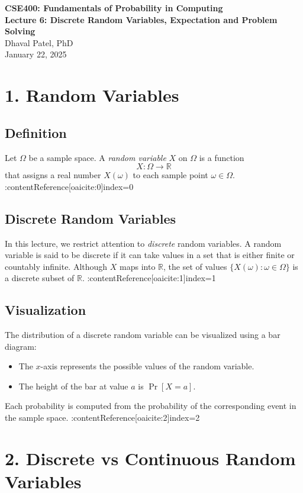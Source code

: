 \documentclass[11pt]{article}
\begin{document}
\begin{center}
\textbf{CSE400: Fundamentals of Probability in Computing}\\
\textbf{Lecture 6: Discrete Random Variables, Expectation and Problem Solving}\\
Dhaval Patel, PhD \\
January 22, 2025
\end{center}

\section*{1. Random Variables}

\subsection*{Definition}
Let $\Omega$ be a sample space.  
A \emph{random variable} $X$ on $\Omega$ is a function
\[
X : \Omega \rightarrow \mathbb{R}
\]
that assigns a real number $X(\omega)$ to each sample point $\omega \in \Omega$. :contentReference[oaicite:0]{index=0}

\subsection*{Discrete Random Variables}
In this lecture, we restrict attention to \emph{discrete} random variables.  
A random variable is said to be discrete if it can take values in a set that is either finite or countably infinite.  
Although $X$ maps into $\mathbb{R}$, the set of values $\{X(\omega) : \omega \in \Omega\}$ is a discrete subset of $\mathbb{R}$. :contentReference[oaicite:1]{index=1}

\subsection*{Visualization}
The distribution of a discrete random variable can be visualized using a bar diagram:
\begin{itemize}
\item The $x$-axis represents the possible values of the random variable.
\item The height of the bar at value $a$ is $\Pr[X = a]$.
\end{itemize}
Each probability is computed from the probability of the corresponding event in the sample space. :contentReference[oaicite:2]{index=2}

\section*{2. Discrete vs Continuous Random Variables}
\end{document}
